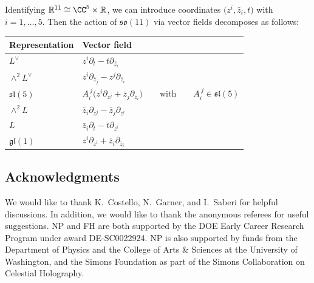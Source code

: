 \documentclass[10pt,a4paper]{amsart}
\numberwithin{equation}{section}
\theoremstyle{definition}
\def\R{\mathbb{R}}
\def\lie#1{\ensuremath{\mathfrak{#1}}}
\def\so{\lie{so}}
\begin{document}
Identifying $\R^{11} \cong \CC^5 \times \R$, we can introduce coordinates $\big(z^i, \bar{z}_i , t\big)$ with $i=1,\dots, 5$. Then the action of $\so(11)$ via vector fields decomposes as follows:
\begin{table}[!ht]\renewcommand{\arraystretch}{1.2}
\centering
\begin{tabular}{|l|l|}
\hline
Representation & Vector field \\ \hline
\( L^\vee \) & \( z^i \partial_t - t \partial_{\bar{z}_i} \) \\
\hline
\( \wedge^2 L^\vee \) & \( z^i \partial_{\bar{z}_j} - z^j \partial_{\bar{z}_i} \) \\ \hline
\( \mathfrak{sl}(5) \) & \( A_{i}^{\ j} \big(z^i \partial_{z^j} + \bar{z}_j \partial_{\bar{z}_i}\big) \qquad \text{with} \qquad A_{i}^{\ j} \in \mathfrak{sl}(5) \) \\
\hline
\( \wedge^2 L \) & \( \bar{z}_i \partial_{z^j} - \bar{z}_j \partial_{z^i} \) \\
\hline
\( L \) & \( \bar{z}_i \partial_t - t \partial_{z^i}\) \\
\hline
\( \mathfrak{gl}(1) \) & \(z^i \partial_{z^i} + \bar{z}_i \partial_{\bar{z}_i}\) \\
\hline
\end{tabular}
\end{table}

\subsection*{Acknowledgments}
We would like to thank K.~Costello, N.~Garner, and I.~Saberi for helpful discussions. In addition, we would like to thank the anonymous referees for useful suggestions. NP and FH are both supported by the DOE Early Career Research Program under award DE-SC0022924. NP is also supported by funds from the Department of Physics and the College of Arts \& Sciences at the University of Washington, and the Simons Foundation as part of the Simons Collaboration on Celestial Holography.
\end{document}
